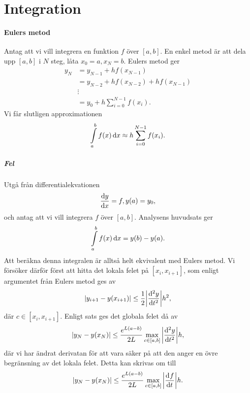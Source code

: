 \section{Integration}

\paragraph{Eulers metod}
Antag att vi vill integrera en funktion $f$ över $[a, b]$. En enkel metod är att dela upp $[a, b]$ i $N$ steg, låta $x_{0} = a, x_{N} = b$. Eulers metod ger
\begin{align*}
	y_{N} &= y_{N - 1} + hf(x_{N - 1}) \\
	      &= y_{N - 2} + hf(x_{N - 2}) + hf(x_{N - 1}) \\
	      &\vdots \\
	      &= y_{0} + h\sum\limits_{i = 0}^{N - 1}f(x_{i}).
\end{align*}
Vi får slutligen approximationen
\begin{align*}
	\int\limits_{a}^{b}f(x)\dd{x} \approx h\sum\limits_{i = 0}^{N - 1}f(x_{i}).
\end{align*}

\subparagraph{Fel}
Utgå från differentialekvationen
\begin{align*}
	\dv{y}{x} = f, y(a) = y_{0},
\end{align*}
och antag att vi vill integrera $f$ över $[a, b]$. Analysens huvudsats ger
\begin{align*}
	\int\limits_{a}^{b}f(x)\dd{x} = y(b) - y(a).
\end{align*}
Att beräkna denna integralen är alltså helt ekvivalent med Eulers metod. Vi försöker därför först att hitta det lokala felet på $[x_{i}, x_{i + 1}]$, som enligt argumentet från Eulers metod ges av
\begin{align*}
	\abs{y_{i + 1} - y(x_{i + 1})} \leq \frac{1}{2}\abs{\dv[2]{y}{t} (c)}h^{2},
\end{align*}
där $c\in [x_{i}, x_{i + 1}]$. Enligt sats ges det globala felet då av
\begin{align*}
	\abs{y_{N} - y(x_{N})} \leq \frac{e^{L(a - b)}}{2L}\max\limits_{c\in [a, b]}\abs{\dv[2]{y}{t} (c)}h,
\end{align*}
där vi har ändrat derivatan för att vara säker på att den anger en övre begränsning av det lokala felet. Detta kan skrivas om till
\begin{align*}
	\abs{y_{N} - y(x_{N})} \leq \frac{e^{L(a - b)}}{2L}\max\limits_{c\in [a, b]}\abs{\dv[]{f}{t} (c)}h.
\end{align*}

